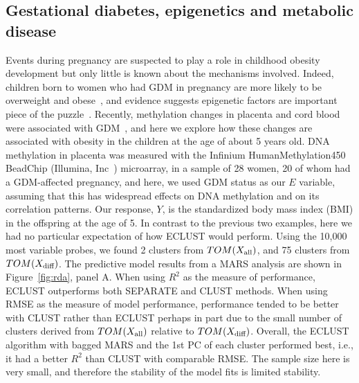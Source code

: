 \subsection{Gestational diabetes, epigenetics and metabolic disease}
Events during pregnancy are suspected to play a role in childhood obesity development but only little is known about the mechanisms involved. Indeed, children born to women who had GDM in pregnancy are more likely to be overweight and obese~\citep{wendland2012gestational}, and evidence suggests epigenetic factors are important piece of the puzzle~\citep{bouchard2010leptin,bouchard2012placental}. Recently, methylation changes in placenta and cord blood were associated with GDM~\citep{ruchat2013gestational}, and here we explore how these changes are associated with obesity in the children at the age of about 5 years old.   DNA methylation in placenta was measured with the Infinium HumanMethylation450 BeadChip (Illumina, Inc~\citep{bibikova2011high}) microarray, in a sample of 28 women, 20 of whom had a GDM-affected pregnancy, and here, we used GDM status as our $E$ variable, assuming that this has widespread effects on DNA methylation and on its correlation patterns.  Our response, $Y$, is the standardized body mass index (BMI) in the offspring at the age of 5. In contrast to the previous two examples, here we had no particular expectation of how ECLUST would perform. Using the 10,000 most variable probes, we found 2 clusters from $TOM(X_{\textrm{{all}}})$, and 75 clusters from $TOM(X_{\textrm{{diff}}})$. The predictive model results from a MARS analysis are shown in Figure~\ref{fig:rda}, panel A. When using $R^2$ as the measure of performance, ECLUST outperforms both SEPARATE and CLUST methods. When using RMSE as the measure of model performance, performance tended to be better with CLUST rather than ECLUST perhaps in part due to the small number of clusters derived from $TOM(X_{\textrm{{all}}})$ relative to $TOM(X_{\textrm{{diff}}})$. Overall, the ECLUST algorithm with bagged MARS and the 1st PC of each cluster performed best, i.e., it had a better $R^2$ than CLUST with comparable RMSE.   The sample size here is very small, and therefore the stability of the model fits is limited stability. 

\begin{comment}
\begin{figure}[h!]
	\centering
	\texttt{[image: figure7.eps]}
	\caption{Model fit measures from analysis of three data sets: (A) Gestational diabetes birth-cohort (B) TCGA Ovarian Cancer study (C) NIH MRI Study with income as the environment variable (D) NIH MRI Study with age as the environment variable}
	\label{fig:rda}
\end{figure}
\end{comment}

